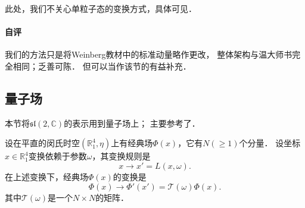 
此处，我们不关心单粒子态的变换方式，具体可见\parencite[\S2.5]{weinberg_vol1}．


\paragraph{自评} 我们的方法只是将Weinberg教材中的标准动量略作更改，
整体架构与温大师书完全相同；乏善可陈．
但可以当作该节\cite[\S2.5]{weinberg_vol1}的有益补充．


\subsection{量子场}

本节将$\mathfrak{sl}(2,\mathbb{C})$的表示用到量子场上；
主要参考了\parencite[\S 4.3]{Greiner-FQ-1996}．


设在平直的闵氏时空$(\mathbb{R}^4_1,\eta)$上有经典场$\Phi(x)$，它有$N(\geqslant 1)$个分量．
设坐标$x\in \mathbb{R}^4_1$变换依赖于参数$\omega$，其变换规则是
\begin{equation}
	x\to x'=L(x,\omega).
\end{equation}
在上述变换下，经典场$\Phi(x)$的变换是
\begin{equation}\label{chlar:eqn_cPhi}
	\Phi(x)\to \Phi'(x')= \mathcal{T}(\omega) \Phi(x).
\end{equation}
其中$\mathcal{T}(\omega)$是一个$N\times N$的矩阵．

